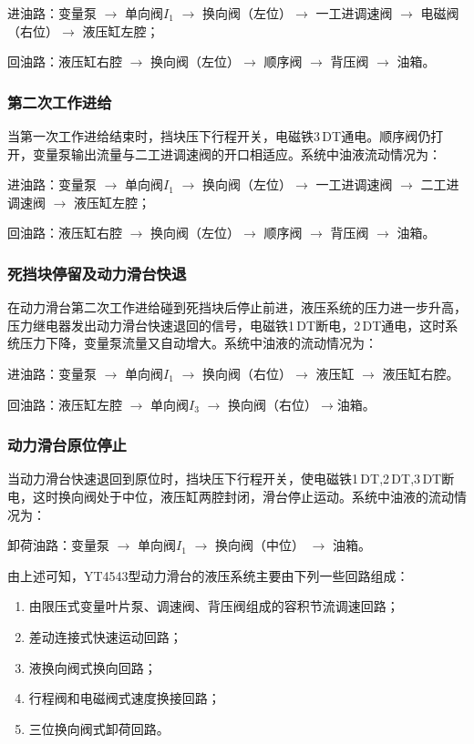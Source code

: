 进油路：变量泵 $\rightarrow$ 单向阀$I_{1}$ $\rightarrow$ 换向阀（左位）$\rightarrow$ 一工进调速阀 $\rightarrow$ 电磁阀（右位）$\rightarrow$ 液压缸左腔；

回油路：液压缸右腔 $\rightarrow$ 换向阀（左位）$\rightarrow$ 顺序阀 $\rightarrow$ 背压阀 $\rightarrow$ 油箱。

\subsubsection {第二次工作进给}

当第一次工作进给结束时，挡块压下行程开关，电磁铁3\,DT通电。顺序阀仍打开，变量泵输出流量与二工进调速阀的开口相适应。系统中油液流动情况为：

进油路：变量泵 $\rightarrow$ 单向阀$I_{1}$ $\rightarrow$ 换向阀（左位）$\rightarrow$ 一工进调速阀 $\rightarrow$ 二工进调速阀 $\rightarrow$ 液压缸左腔；

回油路：液压缸右腔 $\rightarrow$ 换向阀（左位）$\rightarrow$ 顺序阀 $\rightarrow$ 背压阀 $\rightarrow$ 油箱。

\subsubsection {死挡块停留及动力滑台快退}

在动力滑台第二次工作进给碰到死挡块后停止前进，液压系统的压力进一步升高，压力继电器发出动力滑台快速退回的信号，电磁铁1\,DT断电，2\,DT通电，这时系统压力下降，变量泵流量又自动增大。系统中油液的流动情况为：
 
进油路：变量泵 $\rightarrow$ 单向阀$I_{1}$ $\rightarrow$ 换向阀（右位）$\rightarrow$ 液压缸 $\rightarrow$ 液压缸右腔。

回油路：液压缸左腔 $\rightarrow$ 单向阀$I_{3}$ $\rightarrow$ 换向阀（右位）$\rightarrow$油箱。

\subsubsection {动力滑台原位停止}

当动力滑台快速退回到原位时，挡块压下行程开关，使电磁铁1\,DT,2\,DT,3\,DT断电，这时换向阀处于中位，液压缸两腔封闭，滑台停止运动。系统中油液的流动情况为：

卸荷油路：变量泵 $\rightarrow$ 单向阀$I_{1}$ $\rightarrow$ 换向阀（中位） $\rightarrow$ 油箱。

由上述可知，YT4543型动力滑台的液压系统主要由下列一些回路组成：

\begin{enumerate}[(1),leftmargin=0pt,itemindent=3.5\ccwd]
 \item 由限压式变量叶片泵、调速阀、背压阀组成的容积节流调速回路；
 \item 差动连接式快速运动回路；
 \item 液换向阀式换向回路；
 \item 行程阀和电磁阀式速度换接回路；
 \item 三位换向阀式卸荷回路。
\end{enumerate}

